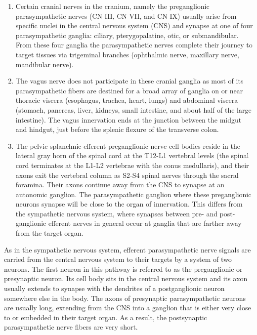 \documentclass[]{book}
\providecommand{\tightlist}{%
  \setlength{\itemsep}{0pt}\setlength{\parskip}{0pt}}
\begin{document}
\begin{enumerate}
\def\labelenumi{\arabic{enumi}.}
\tightlist
\item
  Certain cranial nerves in the cranium, namely the preganglionic parasympathetic nerves (CN III, CN VII, and CN IX) usually arise from specific nuclei in the central nervous system (CNS) and synapse at one of four parasympathetic ganglia: ciliary, pterygopalatine, otic, or submandibular. From these four ganglia the parasympathetic nerves complete their journey to target tissues via trigeminal branches (ophthalmic nerve, maxillary nerve, mandibular nerve).
\item
  The vagus nerve does not participate in these cranial ganglia as most of its parasympathetic fibers are destined for a broad array of ganglia on or near thoracic viscera (esophagus, trachea, heart, lungs) and abdominal viscera (stomach, pancreas, liver, kidneys, small intestine, and about half of the large intestine). The vagus innervation ends at the junction between the midgut and hindgut, just before the splenic flexure of the transverse colon.
\item
  The pelvic splanchnic efferent preganglionic nerve cell bodies reside in the lateral gray horn of the spinal cord at the T12-L1 vertebral levels (the spinal cord terminates at the L1-L2 vertebrae with the conus medullaris), and their axons exit the vertebral column as S2-S4 spinal nerves through the sacral foramina. Their axons continue away from the CNS to synapse at an autonomic ganglion. The parasympathetic ganglion where these preganglionic neurons synapse will be close to the organ of innervation. This differs from the sympathetic nervous system, where synapses between pre- and post-ganglionic efferent nerves in general occur at ganglia that are farther away from the target organ.
\end{enumerate}

As in the sympathetic nervous system, efferent parasympathetic nerve signals are carried from the central nervous system to their targets by a system of two neurons. The first neuron in this pathway is referred to as the preganglionic or presynaptic neuron. Its cell body sits in the central nervous system and its axon usually extends to synapse with the dendrites of a postganglionic neuron somewhere else in the body. The axons of presynaptic parasympathetic neurons are usually long, extending from the CNS into a ganglion that is either very close to or embedded in their target organ. As a result, the postsynaptic parasympathetic nerve fibers are very short.
\end{document}
